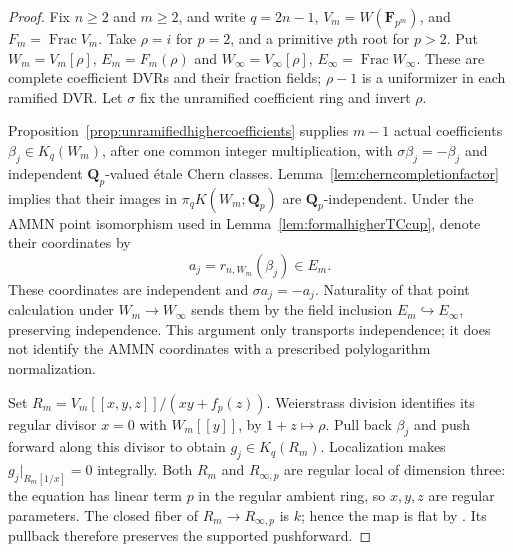 \documentclass[11pt,a4paper]{article}
\theoremstyle{remark}
\newcommand{\Q}{\mathbf Q}
\newcommand{\F}{\mathbf F}
\newcommand{\Frac}{\operatorname{Frac}}
\begin{document}
\begin{proof}
Fix $n\geq2$ and $m\geq2$, and write $q=2n-1$,
$V_m=W(\F_{p^m})$, and $F_m=\Frac V_m$.
Take $\rho=i$ for $p=2$, and a primitive $p$th root for $p>2$.
Put $W_m=V_m[\rho]$, $E_m=F_m(\rho)$ and
$W_\infty=V_\infty[\rho]$, $E_\infty=\Frac W_\infty$.
These are complete coefficient DVRs and their fraction fields;
$\rho-1$ is a uniformizer in each ramified DVR.
Let $\sigma$ fix the unramified coefficient ring and invert $\rho$.

Proposition~\ref{prop:unramifiedhighercoefficients} supplies
$m-1$ actual coefficients $\beta_j\in K_q(W_m)$, after one
common integer multiplication, with $\sigma\beta_j=-\beta_j$
and independent $\Q_p$-valued \'etale Chern classes.
Lemma~\ref{lem:cherncompletionfactor} implies that their images
in $\pi_qK(W_m;\Q_p)$ are $\Q_p$-independent.
Under the AMMN point isomorphism used in
Lemma~\ref{lem:formalhigherTCcup}, denote their coordinates by
\[
 a_j=r_{n,W_m}(\beta_j)\in E_m.
\]
These coordinates are independent and $\sigma a_j=-a_j$.
Naturality of that point calculation under $W_m\to W_\infty$
sends them by the field inclusion $E_m\hookrightarrow E_\infty$,
preserving independence. This argument only transports independence;
it does not identify the AMMN coordinates with a prescribed
polylogarithm normalization.

Set $R_m=V_m[[x,y,z]]/(xy+f_p(z))$.
Weierstrass division identifies its regular divisor $x=0$ with
$W_m[[y]]$, by $1+z\mapsto\rho$.
Pull back $\beta_j$ and push forward along this divisor to obtain
$g_j\in K_q(R_m)$. Localization makes $g_j|_{R_m[1/x]}=0$
integrally.
Both $R_m$ and $R_{\infty,p}$ are regular local of dimension three:
the equation has linear term $p$ in the regular ambient ring,
so $x,y,z$ are regular parameters.
The closed fiber of $R_m\to R_{\infty,p}$ is $k$; hence the map
is flat by \cite[Tag~00R4]{StacksFlatness}.
Its pullback therefore preserves the supported pushforward.


\end{proof}
\end{document}
